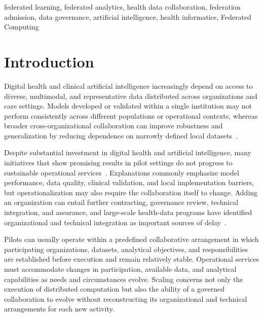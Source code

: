 \documentclass[twoside,11pt]{article}
\begin{document}
\begin{abstract}
\textbf{Conclusions:} OpenHealth demonstrates how a federated health-data collaboration can evolve through differentiated participation relations rather than uniform expansion of membership and privileges. The principal contribution is an executable governance boundary that preserves capability relations and produces adjudicable evidence independently from the federated-learning runtime. The proof of concept does not establish clinical effectiveness or production-scale performance, which require further evaluation.
\end{abstract}

\begin{keywords}
federated learning, federated analytics, health data collaboration, federation admission, data governance, artificial intelligence, health informatics, Federated Computing
\end{keywords}

\section{Introduction}
Digital health and clinical artificial intelligence increasingly depend on access to diverse, multimodal, and representative data distributed across organizations and care settings. Models developed or validated within a single institution may not perform consistently across different populations or operational contexts, whereas broader cross-organizational collaboration can improve robustness and generalization by reducing dependence on narrowly defined local datasets~\cite{rieke_2020, kairouz_2021, li_2020}.

Despite substantial investment in digital health and artificial intelligence, many initiatives that show promising results in pilot settings do not progress to sustainable operational services~\cite{Topol_2019, gandhi_2024}. Explanations commonly emphasize model performance, data quality, clinical validation, and local implementation barriers, but operationalization may also require the collaboration itself to change. Adding an organization can entail further contracting, governance review, technical integration, and assurance, and large-scale health-data programs have identified organizational and technical integration as important sources of delay~\cite{Goldacre_2022}.  

Pilots can usually operate within a predefined collaborative arrangement in which participating organizations, datasets, analytical objectives, and responsibilities are established before execution and remain relatively stable. Operational services must accommodate changes in participation, available data, and analytical capabilities as needs and circumstances evolve. Scaling concerns not only the execution of distributed computation but also the ability of a governed collaboration to evolve without reconstructing its organizational and technical arrangements for each new activity.
\end{document}
